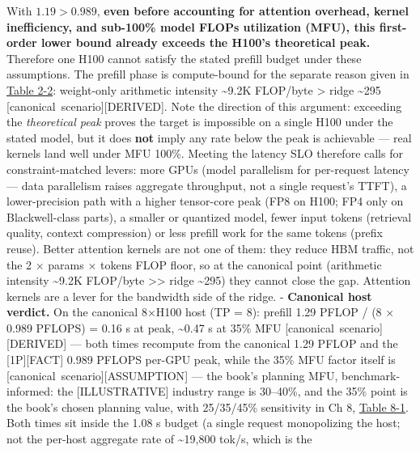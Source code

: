 With \(1.19 > 0.989\), \textbf{even before accounting for attention
overhead, kernel inefficiency, and sub-100\% model FLOPs utilization
(MFU), this first-order lower bound already exceeds the H100's
theoretical peak.} Therefore one H100 cannot satisfy the stated prefill
budget under these assumptions. The prefill phase is compute-bound for
the separate reason given in \hyperref[tab:2.2]{Table 2-2}: weight-only arithmetic intensity
\textasciitilde9.2K FLOP/byte \textgreater{} ridge \textasciitilde295
\mbox{{[}canonical scenario{]}}\hspace{0pt}\mbox{{[}DERIVED{]}}. Note the direction of this
argument: exceeding the \emph{theoretical peak} proves the target is
impossible on a single H100 under the stated model, but it does
\textbf{not} imply any rate below the peak is achievable --- real
kernels land well under MFU 100\%. Meeting the latency SLO therefore
calls for constraint-matched levers: more GPUs (model parallelism for
per-request latency --- data parallelism raises aggregate throughput,
not a single request's TTFT), a lower-precision path with a higher
tensor-core peak (FP8 on H100; FP4 only on Blackwell-class parts), a
smaller or quantized model, fewer input tokens (retrieval quality,
context compression) or less prefill work for the same tokens (prefix
reuse). Better attention kernels are not one of them: they reduce HBM
traffic, not the 2 × params × tokens FLOP floor, so at the canonical
point (arithmetic intensity \textasciitilde9.2K FLOP/byte
\textgreater\textgreater{} ridge \textasciitilde295) they cannot close
the gap. Attention kernels are a lever for the bandwidth side of the
ridge. - \textbf{Canonical host verdict.} On the canonical 8×H100 host
(TP = 8): prefill 1.29 PFLOP / (8 × 0.989 PFLOPS) = 0.16 s at peak,
\textasciitilde0.47 s at 35\% MFU \mbox{{[}canonical scenario{]}}\hspace{0pt}\mbox{{[}DERIVED{]}}
--- both times recompute from the canonical 1.29 PFLOP and the
\mbox{{[}1P{]}}\hspace{0pt}\mbox{{[}FACT{]}} 0.989 PFLOPS per-GPU peak, while the 35\% MFU factor
itself is \mbox{{[}canonical scenario{]}}\hspace{0pt}\mbox{{[}ASSUMPTION{]}} --- the book's
planning MFU, benchmark-informed: the \mbox{{[}ILLUSTRATIVE{]}} industry range
is 30--40\%, and the 35\% point is the book's chosen planning value,
with 25/35/45\% sensitivity in Ch 8, \hyperref[tab:8.1]{Table 8-1}. Both times sit inside
the 1.08 s budget (a single request monopolizing the host; not the
per-host aggregate rate of \textasciitilde19,800 tok/s, which is the
